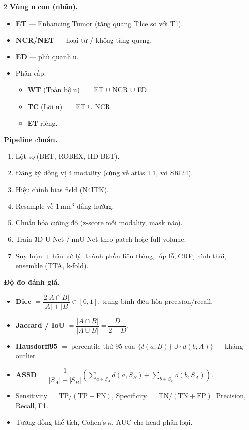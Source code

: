 \begin{paracol}{2}
\textbf{Vùng u con (nhãn).}
\begin{itemize}[leftmargin=*,nosep]
  \item \textbf{ET} — Enhancing Tumor (tăng quang T1ce so với T1).
  \item \textbf{NCR/NET} — hoại tử / không tăng quang.
  \item \textbf{ED} — phù quanh u.
  \item Phân cấp:
    \begin{itemize}[leftmargin=*,nosep]
      \item \textbf{WT} (Toàn bộ u) $=$ ET $\cup$ NCR $\cup$ ED.
      \item \textbf{TC} (Lõi u) $=$ ET $\cup$ NCR.
      \item \textbf{ET} riêng.
    \end{itemize}
\end{itemize}

\textbf{Pipeline chuẩn.}
\begin{enumerate}[leftmargin=*,nosep]
  \item Lột sọ (BET, ROBEX, HD-BET).
  \item Đăng ký đồng vị 4 modality (cứng về atlas T1, vd SRI24).
  \item Hiệu chỉnh bias field (N4ITK).
  \item Resample về 1\,mm$^3$ đẳng hướng.
  \item Chuẩn hóa cường độ (z-score mỗi modality, mask não).
  \item Train 3D U-Net / nnU-Net theo patch hoặc full-volume.
  \item Suy luận + hậu xử lý: thành phần liên thông, lấp lỗ, CRF, hình thái, ensemble (TTA, k-fold).
\end{enumerate}

\textbf{Độ đo đánh giá.}
\begin{itemize}[leftmargin=*,nosep]
  \item \textbf{Dice} $=\dfrac{2|A\cap B|}{|A|+|B|}\in[0,1]$, trung bình điều hòa precision/recall.
  \item \textbf{Jaccard / IoU} $=\dfrac{|A\cap B|}{|A\cup B|}=\dfrac{D}{2-D}$.
  \item \textbf{Hausdorff95} $=$ percentile thứ 95 của $\{d(a,B)\}\cup\{d(b,A)\}$ — kháng outlier.
  \item \textbf{ASSD} $=\dfrac{1}{|S_A|+|S_B|}\!\!\left(\!\sum_{a\in S_A}\!d(a,S_B)\!+\!\!\sum_{b\in S_B}\!d(b,S_A)\!\right)$.
  \item Sensitivity $=\mathrm{TP/(TP+FN)}$, Specificity $=\mathrm{TN/(TN+FP)}$, Precision, Recall, F1.
  \item Tương đồng thể tích, Cohen's $\kappa$, AUC cho head phân loại.
\end{itemize}


\end{paracol}
